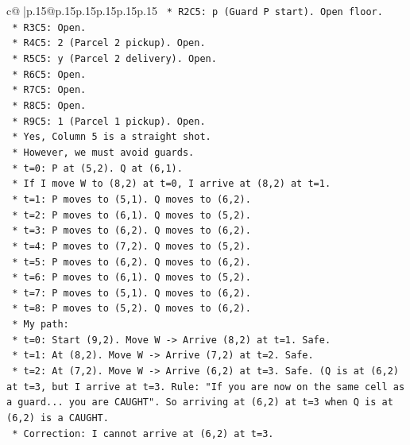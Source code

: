 \documentclass{article}
\begin{document}
{\begin{supertabular}{c@{$\;$}|p{.15\linewidth}@{}p{.15\linewidth}p{.15\linewidth}p{.15\linewidth}p{.15\linewidth}p{.15\linewidth}}
{{{\texttt{            *   R2C5: p (Guard P start). Open floor.} \\
\texttt{            *   R3C5: Open.} \\
\texttt{            *   R4C5: 2 (Parcel 2 pickup). Open.} \\
\texttt{            *   R5C5: y (Parcel 2 delivery). Open.} \\
\texttt{            *   R6C5: Open.} \\
\texttt{            *   R7C5: Open.} \\
\texttt{            *   R8C5: Open.} \\
\texttt{            *   R9C5: 1 (Parcel 1 pickup). Open.} \\
\texttt{        *   Yes, Column 5 is a straight shot.} \\
\texttt{    *   However, we must avoid guards.} \\
\texttt{        *   t=0: P at (5,2). Q at (6,1).} \\
\texttt{        *   If I move W to (8,2) at t=0, I arrive at (8,2) at t=1.} \\
\texttt{        *   t=1: P moves to (5,1). Q moves to (6,2).} \\
\texttt{        *   t=2: P moves to (6,1). Q moves to (5,2).} \\
\texttt{        *   t=3: P moves to (6,2). Q moves to (6,2).} \\
\texttt{        *   t=4: P moves to (7,2). Q moves to (5,2).} \\
\texttt{        *   t=5: P moves to (6,2). Q moves to (6,2).} \\
\texttt{        *   t=6: P moves to (6,1). Q moves to (5,2).} \\
\texttt{        *   t=7: P moves to (5,1). Q moves to (6,2).} \\
\texttt{        *   t=8: P moves to (5,2). Q moves to (6,2).} \\
\texttt{    *   My path:} \\
\texttt{        *   t=0: Start (9,2). Move W {-}> Arrive (8,2) at t=1. Safe.} \\
\texttt{        *   t=1: At (8,2). Move W {-}> Arrive (7,2) at t=2. Safe.} \\
\texttt{        *   t=2: At (7,2). Move W {-}> Arrive (6,2) at t=3. Safe. (Q is at (6,2) at t=3, but I arrive at t=3. Rule: "If you are now on the same cell as a guard... you are CAUGHT". So arriving at (6,2) at t=3 when Q is at (6,2) is a CAUGHT.} \\
\texttt{        *   Correction: I cannot arrive at (6,2) at t=3.} \\
}}}
\end{supertabular}}
\end{document}
